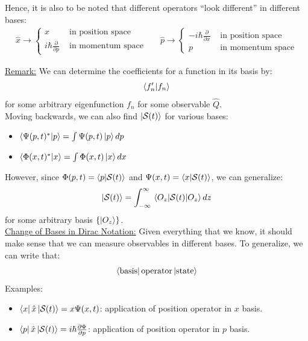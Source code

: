 \documentclass{article}
\newcommand{\gap}{\medskip\\}
\newcommand{\sheader}[1]{\underline{#1:}}
\newcommand{\curly}[1]{\left\{#1\right\}}
\begin{document}
    Hence, it is also to be noted that different operators ``look different'' in 
    different bases:
    \begin{align*}
        \hat{x} \to \begin{cases}
            x & \textrm{ in position space}\\
            i\hbar \frac{\partial}{\partial p} & \textrm{ in momentum space}
        \end{cases} &&
        \hat{p} \to \begin{cases}
            -i\hbar \frac{\partial}{\partial x} & \textrm{ in position space}\\
            p & \textrm{ in momentum space}
        \end{cases}
    \end{align*}

    \sheader{Remark} We can determine the coefficients for a function in its basis by:
    \begin{align*}
        \braket{f'_n}{f_n}
    \end{align*}
    for some arbitrary eigenfunction $f_n$ for some observable $\hat{Q}$.
    \gap
    Moving backwards, we can also find $\ket{\mathcal{S}(t)}$ for various bases:
    \begin{itemize}
        \item $\braket{\Psi(p,t)^*}{p} = \int \Psi(p,t) \ket{p}dp$
        \item $\braket{\Phi(x,t)^*}{x} = \int \Phi(x,t) \ket{x}dx$
    \end{itemize}
    However, since $\Phi(p, t) = \braket{p}{\mathcal{S}(t)}$ and $\Psi(x,t) = \braket{x}{\mathcal{S}(t)}$,
    we can generalize:
    \begin{align*}
        \ket{\mathcal{S}(t)} = \int_{-\infty}^\infty \expval{\mathcal{S}(t)}{O_z} dz
    \end{align*}
    for some arbitrary basis $\curly{\ket{O_z}}$.
    \gap
    \sheader{Change of Bases in Dirac Notation}
    Given everything that we know, it should make sense that we can measure observables 
    in different bases. To generalize, we can write that:
    \begin{align*}
        \bra{\textrm{basis}}\textrm{operator} \ket{\textrm{state}}
    \end{align*}
    Examples:
    \begin{itemize}
        \item $\bra{x}\hat{x}\ket{\mathcal{S}(t)} = x \Psi(x, t)$: application of position operator in $x$ basis.
        \item $\bra{p}\hat{x}\ket{\mathcal{S}(t)} = i\hbar\frac{\partial \Phi}{\partial p}$: application of position operator in $p$ basis.
    \end{itemize}
\end{document}
